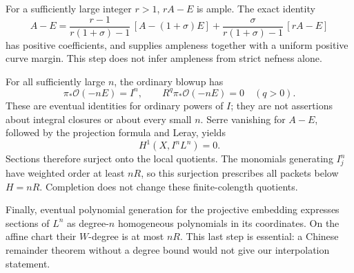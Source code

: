 For a sufficiently large integer \(r>1\), \(rA-E\) is ample. The exact identity
\[
A-E=
\frac{r-1}{r(1+\sigma)-1}\,[A-(1+\sigma)E]
+\frac{\sigma}{r(1+\sigma)-1}\,[rA-E]
\tag{7}
\]
has positive coefficients, and supplies ampleness together with a uniform positive curve margin. This step does not infer ampleness from strict nefness alone.

For all sufficiently large \(n\), the ordinary blowup has
\[
\pi_*\mathcal O(-nE)=I^n,\qquad R^q\pi_*\mathcal O(-nE)=0\quad(q>0).
\]
These are eventual identities for ordinary powers of \(I\); they are not assertions about integral closures or about every small \(n\). Serre vanishing for \(A-E\), followed by the projection formula and Leray, yields
\[
H^1(X,I^nL^n)=0.
\]
Sections therefore surject onto the local quotients. The monomials generating \(I_j^n\) have weighted order at least \(nR\), so this surjection prescribes all packets below \(H=nR\). Completion does not change these finite-colength quotients.

Finally, eventual polynomial generation for the projective embedding expresses sections of \(L^n\) as degree-\(n\) homogeneous polynomials in its coordinates. On the affine chart their \(W\)-degree is at most \(nR\). This last step is essential: a Chinese remainder theorem without a degree bound would not give our interpolation statement.
